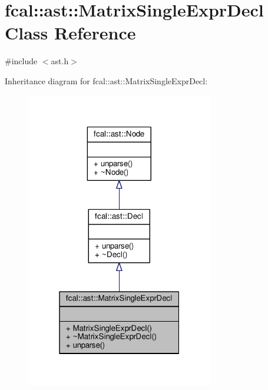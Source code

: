 \hypertarget{classfcal_1_1ast_1_1MatrixSingleExprDecl}{}\section{fcal\+:\+:ast\+:\+:Matrix\+Single\+Expr\+Decl Class Reference}
\label{classfcal_1_1ast_1_1MatrixSingleExprDecl}


{\ttfamily \#include $<$ast.\+h$>$}



Inheritance diagram for fcal\+:\+:ast\+:\+:Matrix\+Single\+Expr\+Decl\+:
\nopagebreak
\begin{figure}[H]
\begin{center}
\leavevmode
\includegraphics[width=232pt]{classfcal_1_1ast_1_1MatrixSingleExprDecl__inherit__graph}
\end{center}
\end{figure}


